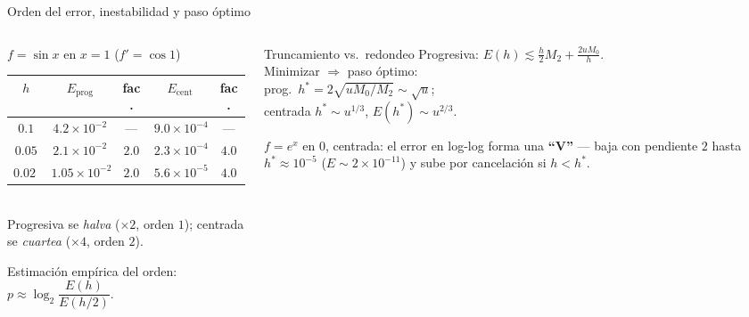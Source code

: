 \documentclass[aspectratio=169,10pt]{beamer}
\begin{document}
\begin{frame}{Orden del error, inestabilidad y paso óptimo}
\begin{columns}[T]
\begin{column}{0.52\textwidth}
\begin{cardgear}{$f=\sin x$ en $x=1$ ($f'=\cos 1$)}{\faTable}
\centering
{\footnotesize\renewcommand{\arraystretch}{1.28}\setlength{\tabcolsep}{5pt}
\begin{tabular}{c|cc|cc}
$h$ & $E_{\text{prog}}$ & fac. & $E_{\text{cent}}$ & fac.\\\hline
$0.1$ & $4.2{\times}10^{-2}$ & — & $9.0{\times}10^{-4}$ & —\\
$0.05$ & $2.1{\times}10^{-2}$ & $2.0$ & $2.3{\times}10^{-4}$ & $4.0$\\
$0.025$ & $1.05{\times}10^{-2}$ & $2.0$ & $5.6{\times}10^{-5}$ & $4.0$\\
\end{tabular}}\\[1.2mm]
{\footnotesize Progresiva se \emph{halva} ($\times2$, orden $1$); centrada se \emph{cuartea} ($\times4$, orden $2$).}
\end{cardgear}
\vspace{1mm}
\begin{cardnota}[\faListOl]
{\footnotesize Estimación empírica del orden: $p\approx\log_2\!\dfrac{E(h)}{E(h/2)}$.}
\end{cardnota}
\end{column}
\begin{column}{0.46\textwidth}
\begin{cardidea}{Truncamiento vs.\ redondeo}{\faSuperscript}
{\footnotesize Progresiva: $E(h)\lesssim\tfrac{h}{2}M_2+\tfrac{2uM_0}{h}$.\\[0.6mm]
Minimizar $\Rightarrow$ paso óptimo:\\[0.2mm]
prog.\ $h^*=2\sqrt{uM_0/M_2}\sim\sqrt{u}$;\\[0.2mm]
centrada $h^*\sim u^{1/3}$, $E(h^*)\sim u^{2/3}$.}
\end{cardidea}
\vspace{1mm}
\begin{cardnota}[\faExclamationTriangle]
{\footnotesize $f=e^x$ en $0$, centrada: el error en log-log forma una \textbf{``V''} — baja con pendiente $2$ hasta $h^*{\approx}10^{-5}$ ($E{\sim}2{\times}10^{-11}$) y sube por cancelación si $h{<}h^*$.}
\end{cardnota}
\end{column}
\end{columns}
\end{frame}
\end{document}
